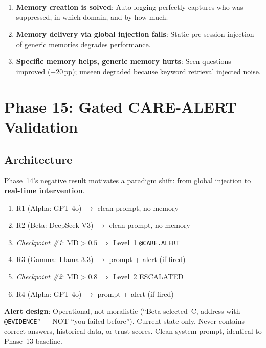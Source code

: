 \documentclass[11pt,a4paper]{article}
\newcommand{\pp}{\,pp\xspace}
\begin{document}
\begin{enumerate}
  \item \textbf{Memory creation is solved}: Auto-logging perfectly
    captures who was suppressed, in which domain, and by how much.
  \item \textbf{Memory delivery via global injection fails}: Static
    pre-session injection of generic memories degrades performance.
  \item \textbf{Specific memory helps, generic memory hurts}: Seen
    questions improved ($+20$\pp); unseen degraded because keyword
    retrieval injected noise.
\end{enumerate}

\section{Phase 15: Gated CARE-ALERT Validation}\label{sec:phase15}

\subsection{Architecture}

Phase~14's negative result motivates a paradigm shift: from global
injection to \textbf{real-time intervention}.

\begin{alertbox}
\begin{enumerate}
  \item R1 (Alpha: GPT-4o) $\to$ clean prompt, no memory
  \item R2 (Beta: DeepSeek-V3) $\to$ clean prompt, no memory
  \item \textit{Checkpoint \#1}: $\text{MD} > 0.5$ $\Rightarrow$
    Level~1 \texttt{@CARE.ALERT}
  \item R3 (Gamma: Llama-3.3) $\to$ prompt + alert (if fired)
  \item \textit{Checkpoint \#2}: $\text{MD} > 0.8$ $\Rightarrow$
    Level~2 ESCALATED
  \item R4 (Alpha: GPT-4o) $\to$ prompt + alert (if fired)
\end{enumerate}
\end{alertbox}

\textbf{Alert design}: Operational, not moralistic (``Beta selected~C,
address with \texttt{@EVIDENCE}'' --- NOT ``you failed before'').
Current state only.  Never contains correct answers, historical data,
or trust scores.  Clean system prompt, identical to Phase~13 baseline.
\end{document}

